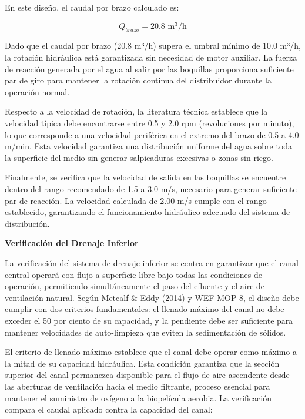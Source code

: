 \documentclass[12pt,a4paper]{article}
\begin{document}
En este diseño, el caudal por brazo calculado es:

\begin{equation}
Q_{brazo} = 20.8 \text{ m}^3\text{/h}
\end{equation}

Dado que el caudal por brazo (20.8 m³/h) supera el umbral mínimo de 10.0 m³/h, la rotación hidráulica está garantizada sin necesidad de motor auxiliar. La fuerza de reacción generada por el agua al salir por las boquillas proporciona suficiente par de giro para mantener la rotación continua del distribuidor durante la operación normal.

Respecto a la velocidad de rotación, la literatura técnica establece que la velocidad típica debe encontrarse entre 0.5 y 2.0 rpm (revoluciones por minuto), lo que corresponde a una velocidad periférica en el extremo del brazo de 0.5 a 4.0 m/min. Esta velocidad garantiza una distribución uniforme del agua sobre toda la superficie del medio sin generar salpicaduras excesivas o zonas sin riego.

Finalmente, se verifica que la velocidad de salida en las boquillas se encuentre dentro del rango recomendado de 1.5 a 3.0 m/s, necesario para generar suficiente par de reacción. La velocidad calculada de 2.00 m/s cumple con el rango establecido, garantizando el funcionamiento hidráulico adecuado del sistema de distribución.

\textbf{Verificación del Drenaje Inferior}

La verificación del sistema de drenaje inferior se centra en garantizar que el canal central operará con flujo a superficie libre bajo todas las condiciones de operación, permitiendo simultáneamente el paso del efluente y el aire de ventilación natural. Según Metcalf \& Eddy (2014) y WEF MOP-8, el diseño debe cumplir con dos criterios fundamentales: el llenado máximo del canal no debe exceder el 50 por ciento de su capacidad, y la pendiente debe ser suficiente para mantener velocidades de auto-limpieza que eviten la sedimentación de sólidos.

El criterio de llenado máximo establece que el canal debe operar como máximo a la mitad de su capacidad hidráulica. Esta condición garantiza que la sección superior del canal permanezca disponible para el flujo de aire ascendente desde las aberturas de ventilación hacia el medio filtrante, proceso esencial para mantener el suministro de oxígeno a la biopelícula aerobia. La verificación compara el caudal aplicado contra la capacidad del canal:
\end{document}
